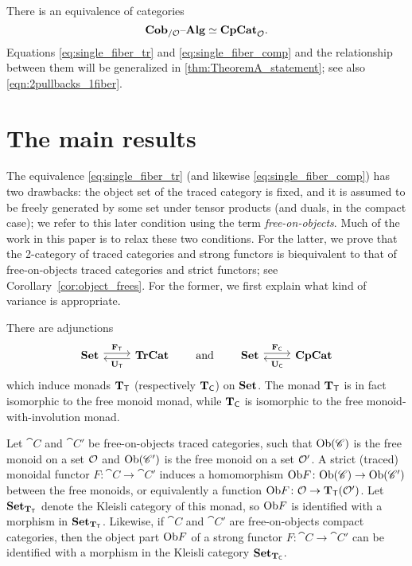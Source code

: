 \documentclass[11pt,oneside,article]{memoir}
\begin{document}
There is an equivalence of categories
\begin{equation}
      \label{eq:single_fiber_comp}
   \mathbf{Cob}_{/\mathcal{O}}{\text \textendash}\mathbf{Alg}\simeq\mathbf{CpCat}_{\mathcal{O}}.
\end{equation}
Equations \eqref{eq:single_fiber_tr} and \eqref{eq:single_fiber_comp} and the relationship between
them will be generalized in \ref{thm:TheoremA_statement}; see also \eqref{eqn:2pullbacks_1fiber}.

\section{The main results}
      \label{subsec:main_results}

The equivalence \eqref{eq:single_fiber_tr} (and likewise \eqref{eq:single_fiber_comp}) has two
drawbacks: the object set of the traced category is fixed, and it is assumed to be freely generated
by some set under tensor products (and duals, in the compact case); we refer to this later condition
using the term \emph{free-on-objects}. Much of the work in this paper is to relax these two
conditions. For the latter, we prove that the 2-category of traced categories and strong functors is
biequivalent to that of free-on-objects traced categories and strict functors; see
Corollary~\ref{cor:object_frees}. For the former, we first explain what kind of variance is
appropriate.

There are adjunctions
\[
   \Adjoint{\Set}{\TrCat}{\FT}{\UT}
   \qquad\text{and}\qquad
   \Adjoint{\Set}{\CompCat}{\FC}{\UC}
\]
which induce monads $\mathbf{T}_{\mathsf{T}}$ (respectively $\mathbf{T}_{\mathsf{C}}$) on $\mathbf{Set}$. The monad $\mathbf{T}_{\mathsf{T}}$ is in fact isomorphic to
the free monoid monad, while $\mathbf{T}_{\mathsf{C}}$ is isomorphic to the free monoid-with-involution monad.

Let $\cat{C}$ and $\cat{C}'$ be free-on-objects traced categories, such that $\mathrm{Ob}(\mathscr{C})$ is the free
monoid on a set $\mathcal{O}$ and $\mathrm{Ob}(\mathscr{C}')$ is the free monoid on a set $\mathcal{O}'$. A strict
(traced) monoidal functor $F\colon \cat{C}\to \cat{C}'$ induces a homomorphism
$\mathrm{Ob} F\colon\mathrm{Ob}(\mathscr{C})\to\mathrm{Ob}(\mathscr{C}')$ between the free monoids, or equivalently a function $\mathrm{Ob}
F\colon\mathcal{O}\to\mathbf{T}_{\mathsf{T}}(\mathcal{O}')$. Let $\mathbf{Set}_{\mathbf{T}_{\mathsf{T}}}$ denote the Kleisli category of this monad, so $\mathrm{Ob}
F$ is identified with a morphism in $\mathbf{Set}_{\mathbf{T}_{\mathsf{T}}}$. Likewise, if $\cat{C}$ and $\cat{C}'$ are
free-on-objects compact categories, then the object part $\mathrm{Ob} F$ of a strong functor
$F\colon\cat{C}\to\cat{C}'$ can be identified with a morphism in the Kleisli category $\mathbf{Set}_{\mathbf{T}_{\mathsf{C}}}$.
\end{document}
